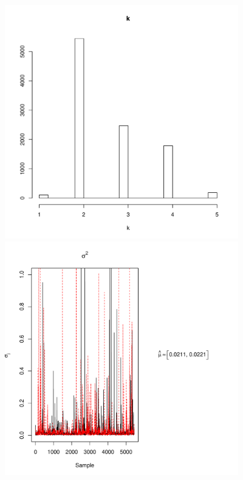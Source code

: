 \documentclass{article}
\begin{document}
\begin{figure}
	\begin{minipage}[h!]{0.49\textwidth}
		\centering
		\includegraphics[width=1\textwidth, height=4in]{kHist.pdf}
	\end{minipage}
	\begin{minipage}[h!]{0.49\textwidth}
		\centering
		\includegraphics[width=1.15\textwidth, height=4in]{sig2Trace2.pdf}	
	\end{minipage}
\end{figure}

\clearpage
\end{document}
